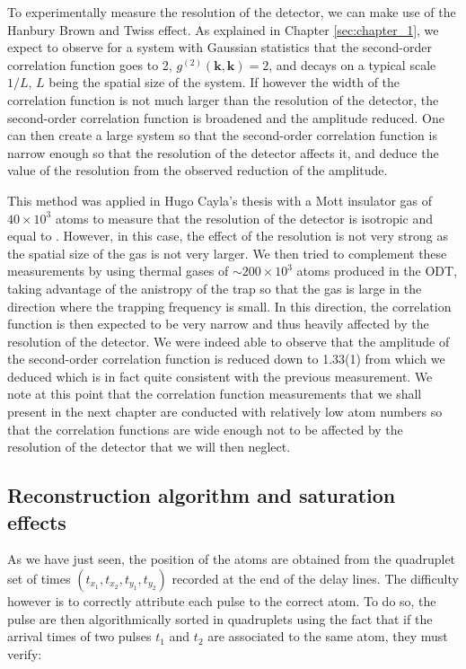  
 To experimentally measure the resolution of the detector, we can make use of the Hanbury Brown and Twiss effect. As explained in Chapter \ref{sec:chapter_1}, we expect to observe for a system with Gaussian statistics that the second-order correlation function goes to 2, $g^{(2)} (\bm{k},\bm{k})=2$, and decays on a typical scale $1/L$, $L$ being the spatial size of the system. If however the width of the correlation function is not much larger than the resolution of the detector, the second-order correlation function is broadened and the amplitude reduced. One can then create a large system so that the second-order correlation function is narrow enough so that the resolution of the detector affects it, and deduce the value of the resolution from the observed reduction of the amplitude.
 
 This method was applied in Hugo Cayla's thesis \cite{cayla_these} with a Mott insulator gas of $40 \times 10^3$ atoms to measure that the resolution of the detector is isotropic and equal to . However, in this case, the effect of the resolution is not very strong as the spatial size of the gas is not very larger. We then tried to complement these measurements by using thermal gases of $\sim 200 \times 10^3$ atoms produced in the ODT, taking advantage of the anistropy of the trap so that the gas is large in the direction where the trapping frequency is small. In this direction, the correlation function is then expected to be very narrow and thus heavily affected by the resolution of the detector. We were indeed able to observe that the amplitude of the second-order correlation function is reduced down to 1.33(1) from which we deduced  which is in fact quite consistent with the previous measurement. We note at this point that the correlation function measurements that we shall present in the next chapter are conducted with relatively low atom numbers so that the correlation functions are wide enough not to be affected by the resolution of the detector that we will then neglect.


\subsection{Reconstruction algorithm and saturation effects}

As we have just seen, the position of the atoms are obtained from the quadruplet set of times $(t_{x_1},t_{x_2},t_{y_1},t_{y_2})$ recorded at the end of the delay lines. The difficulty however is to correctly attribute each pulse to the correct atom. To do so, the pulse are then algorithmically sorted in quadruplets using the fact that if the arrival times of two pulses $t_1$ and $t_2$ are associated to the same atom, they must verify:

